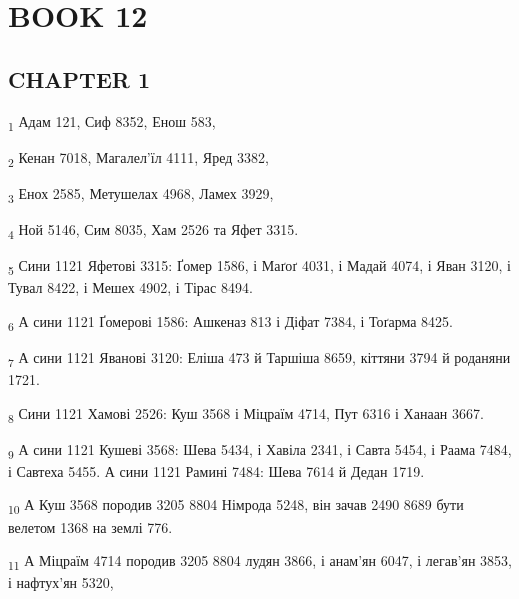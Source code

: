\section{BOOK 12}
\subsection{CHAPTER 1}
\begin{tcolorbox}
\textsubscript{1} Адам 121, Сиф 8352, Енош 583,
\end{tcolorbox}
\begin{tcolorbox}
\textsubscript{2} Кенан 7018, Магалел'їл 4111, Яред 3382,
\end{tcolorbox}
\begin{tcolorbox}
\textsubscript{3} Енох 2585, Метушелах 4968, Ламех 3929,
\end{tcolorbox}
\begin{tcolorbox}
\textsubscript{4} Ной 5146, Сим 8035, Хам 2526 та Яфет 3315.
\end{tcolorbox}
\begin{tcolorbox}
\textsubscript{5} Сини 1121 Яфетові 3315: Ґомер 1586, і Маґоґ 4031, і Мадай 4074, і Яван 3120, і Тувал 8422, і Мешех 4902, і Тірас 8494.
\end{tcolorbox}
\begin{tcolorbox}
\textsubscript{6} А сини 1121 Ґомерові 1586: Ашкеназ 813 і Діфат 7384, і Тоґарма 8425.
\end{tcolorbox}
\begin{tcolorbox}
\textsubscript{7} А сини 1121 Яванові 3120: Еліша 473 й Таршіша 8659, кіттяни 3794 й роданяни 1721.
\end{tcolorbox}
\begin{tcolorbox}
\textsubscript{8} Сини 1121 Хамові 2526: Куш 3568 і Міцраїм 4714, Пут 6316 і Ханаан 3667.
\end{tcolorbox}
\begin{tcolorbox}
\textsubscript{9} А сини 1121 Кушеві 3568: Шева 5434, і Хавіла 2341, і Савта 5454, і Раама 7484, і Савтеха 5455. А сини 1121 Рамині 7484: Шева 7614 й Дедан 1719.
\end{tcolorbox}
\begin{tcolorbox}
\textsubscript{10} А Куш 3568 породив 3205 8804 Німрода 5248, він зачав 2490 8689 бути велетом 1368 на землі 776.
\end{tcolorbox}
\begin{tcolorbox}
\textsubscript{11} А Міцраїм 4714 породив 3205 8804 лудян 3866, і анам'ян 6047, і легав'ян 3853, і нафтух'ян 5320,
\end{tcolorbox}
